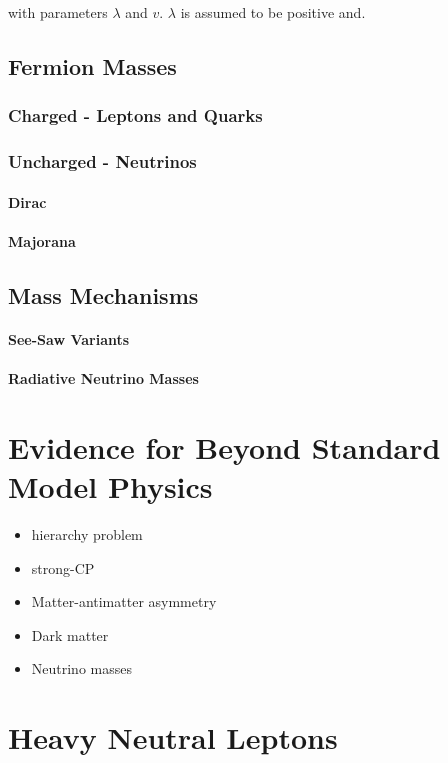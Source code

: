 with parameters $\lambda$ and $v$. $\lambda$ is assumed to be positive and.

\subsection{Fermion Masses}

\subsubsection{Charged - Leptons and Quarks}
\subsubsection{Uncharged - Neutrinos}

\paragraph{Dirac}
\paragraph{Majorana}


\subsection{Mass Mechanisms}
\paragraph{See-Saw Variants}
\paragraph{Radiative Neutrino Masses}


\section{Evidence for Beyond Standard Model Physics}

\begin{itemize}
    \item hierarchy problem
    \item strong-CP
    \item Matter-antimatter asymmetry
    \item Dark matter
    \item Neutrino masses
\end{itemize}


\section{Heavy Neutral Leptons} 

